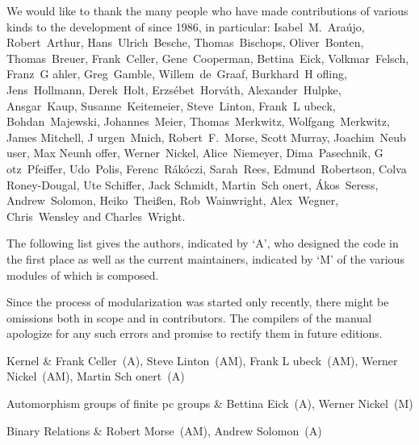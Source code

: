 

{\obeylines%
We would like to thank the many people who have made contributions of
various kinds to the development of {\GAP} since 1986, in particular:
\medskip
Isabel~M.~Ara{\'u}jo, Robert~Arthur, Hans~Ulrich~Besche, Thomas~Bischops,
Oliver~Bonten, Thomas~Breuer, Frank~Celler, Gene~Cooperman, Bettina~Eick,
Volkmar~Felsch, Franz~G{ a}hler, Greg~Gamble, Willem~de~Graaf,
Burkhard~H{ o}fling, Jens~Hollmann, Derek~Holt, Erzs{\'e}bet~Horv{\'a}th, 
Alexander~Hulpke, Ansgar~Kaup, Susanne~Keitemeier, Steve~Linton,
Frank~L{ u}beck, Bohdan~Majewski, Johannes~Meier, Thomas~Merkwitz, 
Wolfgang~Merkwitz, James Mitchell, J{ u}rgen~Mnich, Robert~F.~Morse,
Scott Murray, Joachim~Neub{ u}ser, Max Neunh{ o}ffer,
Werner~Nickel, Alice~Niemeyer, Dima~Pasechnik, G{ o}tz~Pfeiffer,
Udo~Polis, Ferenc~R{\'a}k{\'o}czi, Sarah~Rees, Edmund~Robertson,
Colva Roney-Dougal, Ute Schiffer, Jack Schmidt, Martin~Sch{ o}nert,
{\'A}kos~Seress, Andrew~Solomon, Heiko~Thei{\ss}en, Rob~Wainwright,
Alex~Wegner, Chris~Wensley and Charles~Wright.
}%
\bigskip \bigskip \bigskip

The following list gives the authors, indicated by `A', who designed the code in the first
place as well as the current maintainers, indicated by `M' of the various modules of which
{\GAP} is composed.

Since the process of modularization was started only recently, there might
be omissions both in scope and in contributors.  The compilers of the
manual apologize for any such errors and promise to rectify them in future
editions.

\hfuzz=5pt%

\beginitems
Kernel & 
Frank Celler~(A), Steve Linton~(AM), Frank L{ u}beck~(AM), 
Werner Nickel~(AM), Martin Sch{ o}nert~(A)

Automorphism groups of finite pc groups &
Bettina Eick~(A), Werner Nickel~(M)

Binary Relations &
Robert Morse~(AM), Andrew Solomon~(A) 

